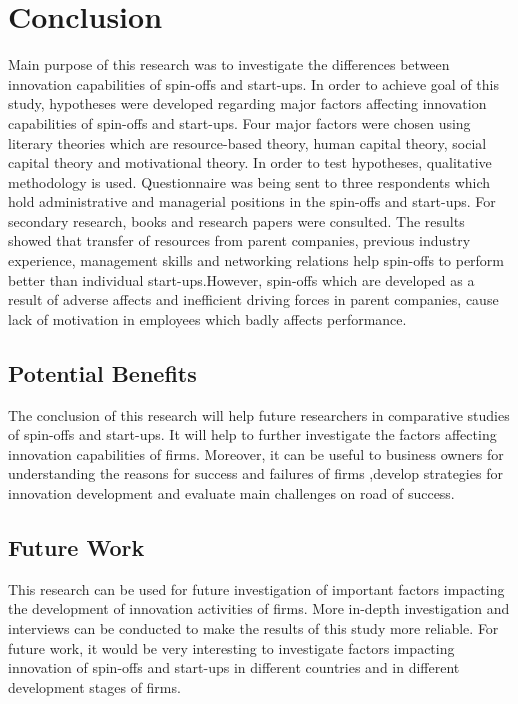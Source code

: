 \chapter{Conclusion\label{cha:chapter6}}
Main purpose of this research was to investigate the differences between innovation capabilities of
spin-offs and start-ups. In order to achieve goal of this study, hypotheses were developed regarding
major factors affecting innovation capabilities of spin-offs and start-ups. Four major factors were
chosen using literary theories which are resource-based theory, human capital theory, social capital
theory and motivational theory. In order to test hypotheses, qualitative methodology is used.
Questionnaire was being sent to three respondents which hold administrative and managerial positions in the
spin-offs and start-ups. For secondary research, books and research papers were consulted. The
results showed that transfer of resources from parent companies, previous industry experience,
management skills and networking relations help spin-offs to perform better than individual start-ups.However, spin-offs which are developed as a result of adverse affects and inefficient driving
forces in parent companies, cause lack of motivation in employees which badly affects
performance.

\section{Potential Benefits}
The conclusion of this research will help future researchers in comparative studies of spin-offs and
start-ups. It will help to further investigate the factors affecting innovation capabilities of firms.
Moreover, it can be useful to business owners for understanding the reasons for success and failures
of firms ,develop strategies for innovation development and evaluate main
challenges on road of success.
\section{Future Work}
This research can be used for future investigation of important factors impacting
the development of innovation activities of firms. More in-depth investigation and interviews can be conducted
to make the results of this study more reliable. For future work, it would be very interesting to investigate
factors impacting innovation of spin-offs and start-ups in different countries and in different development stages
of firms.
